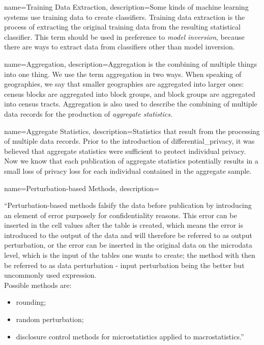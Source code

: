 {
    name=Training Data Extraction,
    description={Some kinds of machine learning systems use training data to create classifiers. Training data extraction is the process of extracting the original training data from the resulting statistical classifier. This term should be used in preference to \textit{model inversion}, because there are ways to extract data from classifiers other than model inversion. }
}

{
    name=Aggregation,
    description={Aggregation is the combining of multiple things into one thing. We use the term aggregation in two ways. When speaking of geographies, we say that smaller geographies are aggregated into larger ones: census blocks are aggregated into block groups, and block groups are aggregated into census tracts. Aggregation is also used to describe the combining of multiple data \glspl{record} for the production of \emph{aggregate statistics}.
    }
}

{
    name=Aggregate Statistics,
    description={Statistics that result from the processing of multiple data \glspl{record}. Prior to the introduction of \gls{differential_privacy}, it was believed that aggregate statistics were sufficient to protect individual privacy. Now we know that each publication of aggregate statistics potentially results in a small loss of privacy loss for each individual contained in the aggregate sample.}
}

{
    name=Perturbation-based Methods,
    description={``Perturbation-based methods falsify the data before publication by introducing an element of error purposely for confidentiality reasons. This error can be inserted in the cell values after the table is created, which means the error is introduced to the output of the data and will therefore be referred to as output perturbation, or the error can be inserted in the original data on the microdata level, which is the input of the tables one wants to create; the method with then be referred to as data perturbation - input perturbation being the better but uncommonly used expression.
~\\
Possible methods are:
\begin{itemize}
\item rounding;
      \item random perturbation;
      \item disclosure control methods for microstatistics applied to macrostatistics.''\parencite{oecd_oecd_nodate}
\end{itemize}
    }
}

